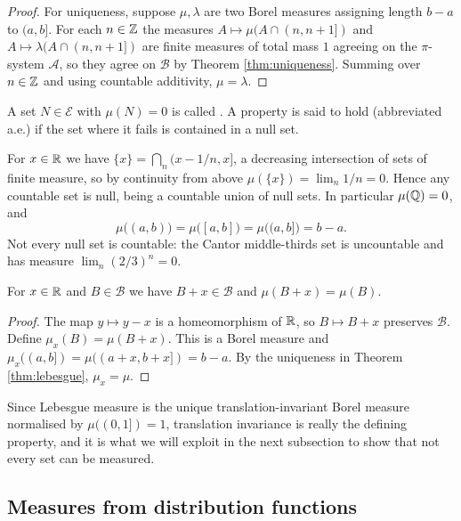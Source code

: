 \documentclass[a4paper]{scrartcl}
\newcommand{\cA}{\mathcal{A}}
\newcommand{\cB}{\mathcal{B}}
\newcommand{\cE}{\mathcal{E}}
\begin{document}
\begin{proof}
	For uniqueness, suppose $\mu, \lambda$ are two Borel measures assigning length $b-a$ to $(a,b]$. For each $n \in \mathbb{Z}$ the measures $A \mapsto \mu(A \cap (n, n+1])$ and $A \mapsto \lambda(A \cap (n,n+1])$ are finite measures of total mass $1$ agreeing on the $\pi$-system $\cA$, so they agree on $\cB$ by Theorem \ref{thm:uniqueness}. Summing over $n \in \mathbb{Z}$ and using countable additivity, $\mu = \lambda$.
\end{proof}

\begin{definition}
	A set $N \in \cE$ with $\mu(N) = 0$ is called . A property is said to hold  (abbreviated a.e.) if the set where it fails is contained in a null set.
\end{definition}

\begin{example}
	For $x \in \mathbb{R}$ we have $\{x\} = \bigcap_n (x - 1/n, x]$, a decreasing intersection of sets of finite measure, so by continuity from above $\mu(\{x\}) = \lim_n 1/n = 0$. Hence any countable set is null, being a countable union of null sets. In particular $\mu(\mathbb{Q}) = 0$, and
	$$
	\mu\big((a,b)\big) = \mu\big([a,b]\big) = \mu\big((a,b]\big) = b - a.
	$$
	Not every null set is countable: the Cantor middle-thirds set is uncountable and has measure $\lim_n (2/3)^n = 0$.
\end{example}

\begin{proposition}
	For $x \in \mathbb{R}$ and $B \in \cB$ we have $B + x \in \cB$ and $\mu(B+x) = \mu(B)$.
\end{proposition}
\begin{proof}
	The map $y \mapsto y - x$ is a homeomorphism of $\mathbb{R}$, so $B \mapsto B + x$ preserves $\cB$. Define $\mu_x(B) = \mu(B+x)$. This is a Borel measure and $\mu_x((a,b]) = \mu((a+x, b+x]) = b-a$. By the uniqueness in Theorem \ref{thm:lebesgue}, $\mu_x = \mu$.
\end{proof}

Since Lebesgue measure is the unique translation-invariant Borel measure normalised by $\mu((0,1]) = 1$, translation invariance is really the defining property, and it is what we will exploit in the next subsection to show that not every set can be measured.

\subsection{Measures from distribution functions}
\end{document}
